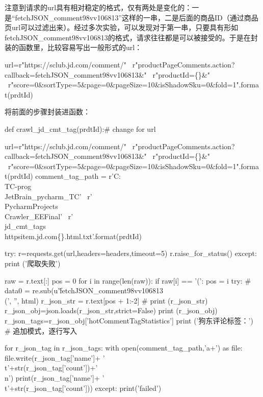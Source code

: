 注意到请求的url具有相对稳定的格式，仅有两处是变化的：一是“fetchJSON_comment98vv106813”这样的一串，二是后面的商品ID（通过商品页url可以过滤出来）。经过多次实验，可以发现对于第一串，只要具有形如fetchJSON_comment98vv106813的格式，请求往往都是可以被接受的。于是在封装的函数里，比较容易写出一般形式的url：
\begin{python}
url=r"https://sclub.jd.com/comment/" \
        r"productPageComments.action?callback=fetchJSON_comment98vv106813\&" \
        r"productId=\{\}\&" \
        r"score=0\&sortType=5\&page=0\&pageSize=10\&isShadowSku=0\&fold=1".format(prdtId)
\end{python}
将前面的步骤封装进函数：
\begin{python}
def crawl_jd_cmt_tag(prdtId):# change for url

    url=r"https://sclub.jd.com/comment/" \
   	   r"productPageComments.action?callback=fetchJSON_comment98vv106813\&" \
 	   r"productId=\{\}\&" \
 	   r"score=0\&sortType=5\&page=0\&pageSize=10\&isShadowSku=0\&fold=1".format(prdtId)
    comment_tag_path = r'C:\\TC-prog\\JetBrain\_pycharm\_TC' \
                   r'\\PycharmProjects\\Crawler\_EEFinal' \
                   r'\\jd\_cmt\_tags\\httpsitem.jd.com\{\}.html.txt'.format(prdtId)

    try:
        r=requests.get(url,headers=headers,timeout=5)
        r.raise_for_status()
    except:
        print ('爬取失败')

    raw = r.text[:]
    pos = 0
    for i in range(len(raw)):
        if raw[i] == '(':
            pos = i
    try:
        # data0 = re.sub(u'\^fetchJSON\_comment98vv106813\\(', '', html)
        r\_json\_str = r.text[pos + 1:-2]
        # print (r\_json\_str)
        r\_json\_obj=json.loads(r\_json\_str,strict=False)
        print (r\_json\_obj)
        r\_json\_tags=r\_json\_obj['hotCommentTagStatistics']
        print ('狗东评论标签：')
        # 追加模式，逐行写入

        for r\_json\_tag in r\_json\_tags:
            with open(comment\_tag\_path,'a+') as file:
                file.write(r\_json\_tag['name']+
                           '\\t'+str(r\_json\_tag['count'])+'\\n')
                print(r\_json\_tag['name']+
                      '\\t'+str(r\_json\_tag['count']))
    except:
        print('failed')
\end{python}

